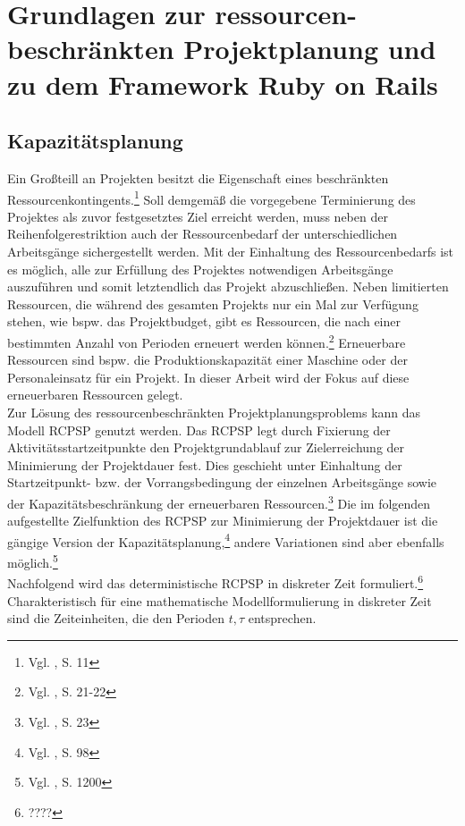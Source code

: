 \documentclass[a4paper,12pt,parskip,bibtotoc,liststotoc]{article}
\begin{document}
\section{Grundlagen zur ressourcen-beschränkten Projektplanung und zu dem Framework Ruby on Rails} \label{Grund}
\subsection{Kapazitätsplanung}
Ein Großteill an Projekten besitzt die Eigenschaft eines beschränkten Ressourcenkontingents.\footnote{Vgl. \cite{kellenbrink2014einfuhrung}, S. 11} Soll demgemäß die vorgegebene Terminierung des Projektes als zuvor festgesetztes Ziel erreicht werden, muss neben der Reihenfolgerestriktion auch der Ressourcenbedarf der unterschiedlichen Arbeitsgänge sichergestellt werden. Mit der Einhaltung des Ressourcenbedarfs ist es möglich, alle zur Erfüllung des Projektes notwendigen Arbeitsgänge auszuführen und somit letztendlich das Projekt abzuschließen. Neben limitierten Ressourcen, die während des gesamten Projekts nur ein Mal zur Verfügung stehen, wie bspw. das Projektbudget, gibt es Ressourcen, die nach einer bestimmten Anzahl von Perioden erneuert werden können.\footnote{Vgl. \cite{neumann2003project}, S. 21-22} Erneuerbare Ressourcen sind bspw. die Produktionskapazität einer Maschine oder der Personaleinsatz für ein Projekt. In dieser Arbeit wird der Fokus auf diese erneuerbaren Ressourcen gelegt.\\

Zur Lösung des ressourcenbeschränkten Projektplanungsproblems kann das Modell RCPSP genutzt werden. Das RCPSP legt durch Fixierung der Aktivitätsstartzeitpunkte den Projektgrundablauf zur Zielerreichung der Minimierung der Projektdauer fest. Dies geschieht unter Einhaltung der Startzeitpunkt- bzw. der Vorrangsbedingung der einzelnen Arbeitsgänge sowie der Kapazitätsbeschränkung der erneuerbaren Ressourcen.\footnote{Vgl. \cite{demeulemeester2011robust}, S. 23} Die im folgenden aufgestellte Zielfunktion des RCPSP zur Minimierung der Projektdauer ist die gängige Version der Kapazitätsplanung,\footnote{Vgl. \cite{drexl1997neuere}, S. 98} andere Variationen sind aber ebenfalls möglich.\footnote{Vgl. \cite{talbot1982resource}, S. 1200}\\

Nachfolgend wird das deterministische RCPSP in diskreter Zeit formuliert.\footnote{????} Charakteristisch für eine mathematische Modellformulierung in diskreter Zeit sind die Zeiteinheiten, die den Perioden $t, \tau$ entsprechen.\\
\end{document}
